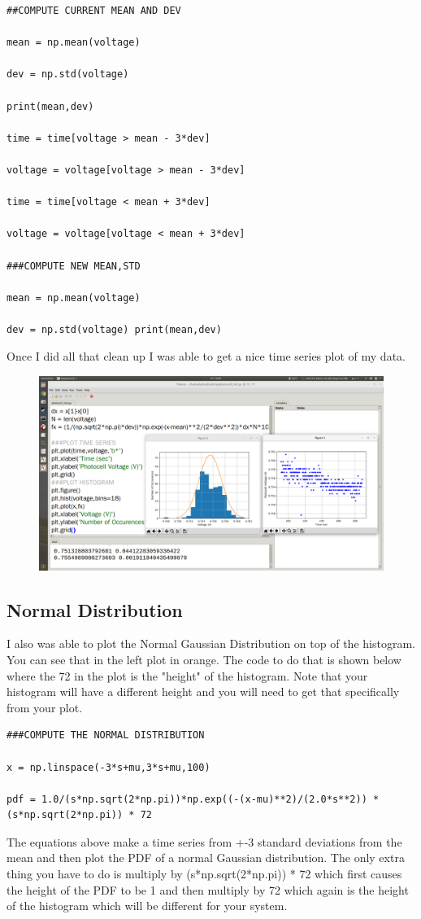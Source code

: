 \begin{verbatim}
##COMPUTE CURRENT MEAN AND DEV 

mean = np.mean(voltage) 

dev = np.std(voltage) 

print(mean,dev) 

time = time[voltage > mean - 3*dev]

voltage = voltage[voltage > mean - 3*dev] 

time = time[voltage < mean + 3*dev] 

voltage = voltage[voltage < mean + 3*dev]

###COMPUTE NEW MEAN,STD 

mean = np.mean(voltage) 

dev = np.std(voltage) print(mean,dev)
\end{verbatim}

Once I did all that clean up I was able to get a nice time series plot of my data. 
\begin{figure}[H]
  \begin{center}
    \includegraphics[width=\textwidth]{Figures/histogram_good.png}
  \end{center}
\end{figure}
\subsection{Normal Distribution}
I also was able to plot the Normal Gaussian Distribution on top of the histogram. You can see that in the left plot in orange. The code to do that is shown below where the 72 in the plot is the "height" of the histogram. Note that your histogram will have a different height and you will need to get that specifically from your plot. 
\begin{verbatim}
###COMPUTE THE NORMAL DISTRIBUTION 

x = np.linspace(-3*s+mu,3*s+mu,100) 

pdf = 1.0/(s*np.sqrt(2*np.pi))*np.exp((-(x-mu)**2)/(2.0*s**2)) * (s*np.sqrt(2*np.pi)) * 72
\end{verbatim}
The equations above make a time series from +-3 standard deviations from the mean and then plot the PDF of a normal Gaussian distribution. The only extra thing you have to do is multiply by (s*np.sqrt(2*np.pi)) * 72 which first causes the height of the PDF to be 1 and then multiply by 72 which again is the height of the histogram which will be different for your system.

